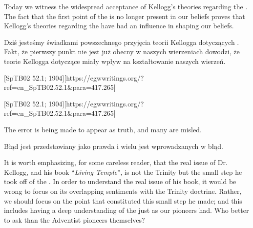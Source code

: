 Today we witness the widespread acceptance of Kellogg’s theories regarding the . The fact that the first point of the  is no longer present in our beliefs proves that Kellogg’s theories regarding the  have had an influence in shaping our beliefs.


Dziś jesteśmy świadkami powszechnego przyjęcia teorii Kellogga dotyczących . Fakt, że pierwszy punkt  nie jest już obecny w naszych wierzeniach dowodzi, że teorie Kellogga dotyczące  miały wpływ na kształtowanie naszych wierzeń.


[SpTB02 52.1; 1904][https://egwwritings.org/?ref=en\_SpTB02.52.1&para=417.265]


[SpTB02 52.1; 1904][https://egwwritings.org/?ref=en\_SpTB02.52.1&para=417.265]


The error is being made to appear as truth, and many are misled.


Błąd jest przedstawiany jako prawda i wielu jest wprowadzanych w błąd.


It is worth emphasizing, for some careless reader, that the real issue of Dr. Kellogg, and his book “\textit{Living Temple}”, is not the Trinity but the small step he took off of the . In order to understand the real issue of his book, it would be wrong to focus on its overlapping sentiments with the Trinity doctrine. Rather, we should focus on the point that constituted this small step he made; and this includes having a deep understanding of the  just as our pioneers had. Who better to ask than the Adventist pioneers themselves?


